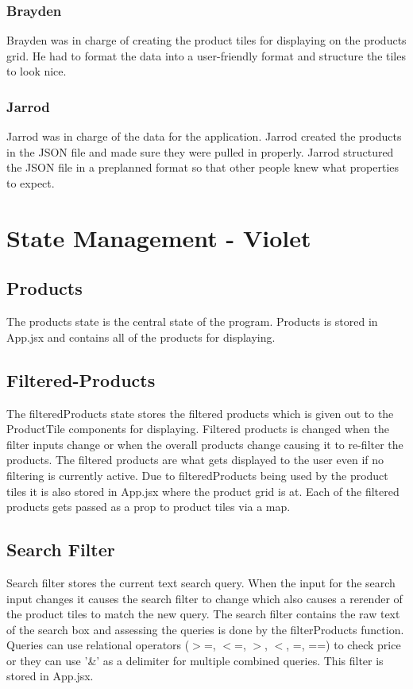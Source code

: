 \documentclass{article}[12pt]
\begin{document}
\subsubsection{Brayden}
Brayden was in charge of creating the product tiles for displaying on the products grid. He had to format the data into a user-friendly format and structure the tiles to look nice.
\subsubsection{Jarrod}
Jarrod was in charge of the data for the application. Jarrod created the products in the JSON file and made sure they were pulled in properly. Jarrod structured the JSON file in a preplanned format so that other people knew what properties to expect.

\section{State Management - Violet}
\subsection{Products}
The products state is the central state of the program. Products is stored in App.jsx and contains all of the products for displaying.
\subsection{Filtered-Products}
The filteredProducts state stores the filtered products which is given out to the ProductTile components for displaying. Filtered products is changed when the filter inputs change or when the overall products change causing it to re-filter the products. The filtered products are what gets displayed to the user even if no filtering is currently active. Due to filteredProducts being used by the product tiles it is also stored in App.jsx where the product grid is at. Each of the filtered products gets passed as a prop to product tiles via a map.
\subsection{Search Filter}
Search filter stores the current text search query. When the input for the search input changes it causes the search filter to change which also causes a rerender of the product tiles to match the new query. The search filter contains the raw text of the search box and assessing the queries is done by the filterProducts function. Queries can use relational operators ($>$=, $<$=, $>$, $<$, =, ==) to check price or they can use '\&' as a delimiter for multiple combined queries. This filter is stored in App.jsx.
\end{document}
